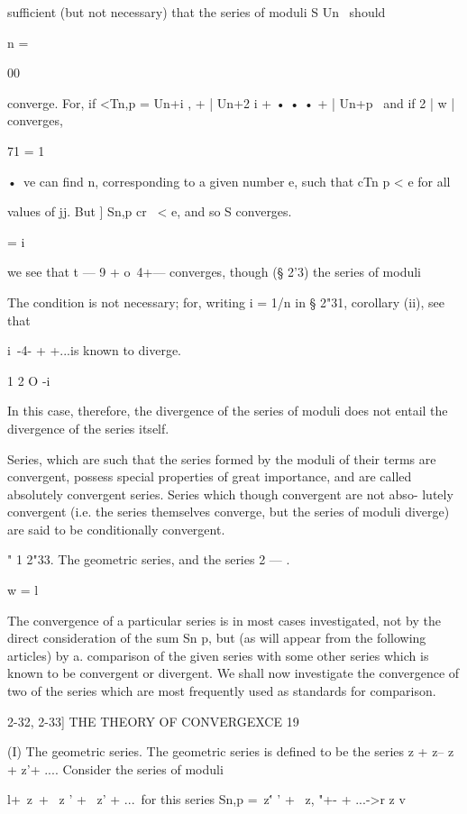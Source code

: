 sufficient (but not necessary) that the series of moduli S Un \ should

n = \

00

converge. For, if <Tn,p = Un+i , + | Un+2 i + • • • + | Un+p \ and if
2 | w | converges,

71 = 1

•\ ve can find n, corresponding to a given number e, such that cTn p <
e for all

values of jj. But ] Sn,p cr \ < e, and so S converges.

  = i



we see that t — 9 + o~4+--- converges, though (§ 2'3) the series of
moduli



The condition is not necessary; for, writing i = 1/n in § 2"31,
corollary (ii), see that

i\ -4- + +...is known to diverge.

1 2 O -i

In this case, therefore, the divergence of the series of moduli does
not entail the divergence of the series itself.

Series, which are such that the series formed by the moduli of their
terms are convergent, possess special properties of great importance,
and are called absolutely convergent series. Series which though
convergent are not abso- lutely convergent (i.e. the series themselves
converge, but the series of moduli diverge) are said to be
conditionally convergent.

" 1 2"33. The geometric series, and the series 2 — .

w = l

The convergence of a particular series is in most cases investigated,
not by the direct consideration of the sum Sn p, but (as will appear
from the following articles) by a. comparison of the given series with
some other series which is known to be convergent or divergent. We
shall now investigate the convergence of two of the series which are
most frequently used as standards for comparison.



2-32, 2-33] THE THEORY OF CONVERGEXCE 19

(I) The geometric series. The geometric series is defined to be the
series z + z-- z + z'+ .... Consider the series of moduli

l+\ z\ + \ z ' + \ z' + ...\ for this series Sn,p =\ z\'' ' + \ z, "+-
+ ...->r z v

